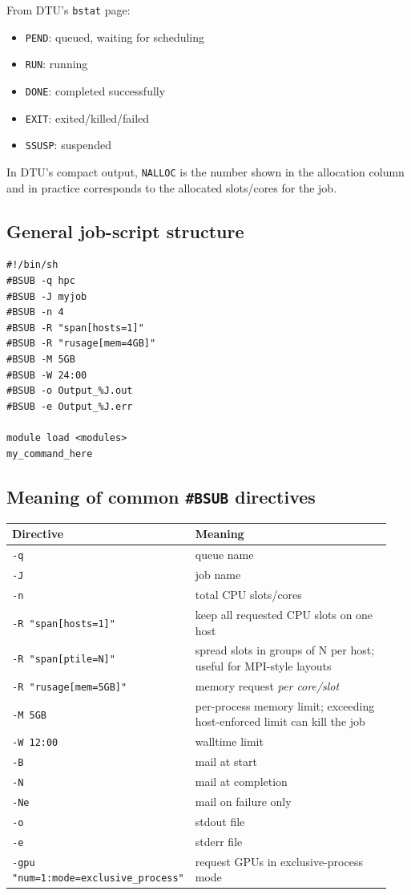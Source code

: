 \documentclass[11pt,a4paper]{article}
\begin{document}
From DTU's \texttt{bstat} page:

\begin{itemize}[leftmargin=1.5em]
  \item \texttt{PEND}: queued, waiting for scheduling
  \item \texttt{RUN}: running
  \item \texttt{DONE}: completed successfully
  \item \texttt{EXIT}: exited/killed/failed
  \item \texttt{SSUSP}: suspended
\end{itemize}

In DTU's compact output, \texttt{NALLOC} is the number shown in the allocation column and in practice corresponds to the allocated slots/cores for the job.

\subsection{General job-script structure}

\begin{lstlisting}[style=shell]
#!/bin/sh
#BSUB -q hpc
#BSUB -J myjob
#BSUB -n 4
#BSUB -R "span[hosts=1]"
#BSUB -R "rusage[mem=4GB]"
#BSUB -M 5GB
#BSUB -W 24:00
#BSUB -o Output_%J.out
#BSUB -e Output_%J.err

module load <modules>
my_command_here
\end{lstlisting}

\subsection{Meaning of common \texttt{\#BSUB} directives}

\begin{longtable}{p{0.24\linewidth} p{0.70\linewidth}}
\toprule
Directive & Meaning \\
\midrule
\texttt{-q} & queue name \\
\texttt{-J} & job name \\
\texttt{-n} & total CPU slots/cores \\
\texttt{-R "span[hosts=1]"} & keep all requested CPU slots on one host \\
\texttt{-R "span[ptile=N]"} & spread slots in groups of N per host; useful for MPI-style layouts \\
\texttt{-R "rusage[mem=5GB]"} & memory request \emph{per core/slot} \\
\texttt{-M 5GB} & per-process memory limit; exceeding host-enforced limit can kill the job \\
\texttt{-W 12:00} & walltime limit \\
\texttt{-B} & mail at start \\
\texttt{-N} & mail at completion \\
\texttt{-Ne} & mail on failure only \\
\texttt{-o} & stdout file \\
\texttt{-e} & stderr file \\
\texttt{-gpu "num=1:mode=exclusive\_process"} & request GPUs in exclusive-process mode \\
\bottomrule
\end{longtable}
\end{document}

